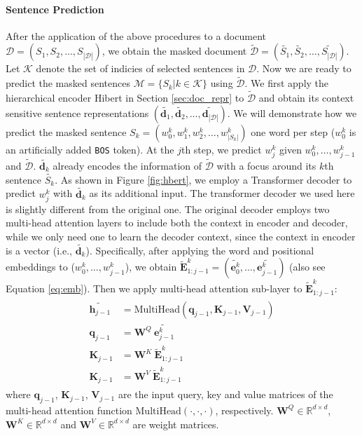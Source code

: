 \documentclass[11pt,a4paper]{article}
\begin{document}
\paragraph{Sentence Prediction} After the application of the above procedures to a document $\mathcal{D} = (S_1, S_2, \dots, S_{| \mathcal{D} |})$, we obtain the masked document $\widetilde{ \mathcal{D} }= (\tilde{S_1}, \tilde{S_2}, \dots, \tilde{S_{| \mathcal{D} |}})$. Let $\mathcal{K} $ denote the set of indicies of selected sentences in $\mathcal{D}$. Now we are ready to predict the masked sentences $\mathcal{M} =  \{S_k | k \in \mathcal{K} \}$ using $\widetilde{ \mathcal{D} }$. 
We first apply the hierarchical encoder {\sc Hibert} in Section \ref{sec:doc_repr} to $\widetilde{ \mathcal{D} }$ and obtain its context sensitive sentence representations $( \tilde{ \mathbf{d}_1 }, \tilde{ \mathbf{d}_2 }, \dots, \tilde{ \mathbf{d}_{| \mathcal{D} |} } )$. We will demonstrate how we predict the masked sentence $S_k = (w_0^k, w_1^k, w_2^k, \dots, w_{|S_k|}^k)$ one word per step ($w_0^k$ is an artificially added {\tt BOS} token). At the $j$th step, we predict $w_j^k$ given $w_0^k,\dots,w_{j-1}^k$ and $\widetilde{ \mathcal{D} }$. $\tilde{ \mathbf{d}_k }$ already encodes the information of $\widetilde{ \mathcal{D} }$ with a focus around its $k$th sentence $\tilde{S_k}$. As shown in Figure \ref{fig:hbert}, we employ a Transformer decoder \cite{vaswani:2017:nips} to predict $w_j^k$ with $\tilde{ \mathbf{d}_k }$ as its additional input. The transformer decoder we used here is slightly different from the original one. The original decoder employs two multi-head attention layers to include both the context in encoder and decoder, while we only need one to learn the decoder context, since the context in encoder is a vector (i.e., $\tilde{ \mathbf{d}_k }$). Specifically, after applying the word and positional embeddings to ($w_0^k,\dots,w_{j-1}^k$), we obtain $\widetilde{ \mathbf{E} }^k_{1:j-1} = (\tilde{\mathbf{e}_0^k}, \dots, \tilde{\mathbf{e}_{j-1}^k})$ (also see Equation \ref{eq:emb}). Then we apply multi-head attention sub-layer to $\widetilde{ \mathbf{E} }^k_{1:j-1}$:
\begin{align}
\label{eq:mhead}
\begin{split}
\tilde{\mathbf{h}_{j-1}} &= \text{MultiHead}(\mathbf{q}_{j-1}, \mathbf{K}_{j-1}, \mathbf{V}_{j-1}) \\
\mathbf{q}_{j-1} &= \mathbf{W}^Q \: \tilde{\mathbf{e}_{j-1}^k}  \\
\mathbf{K}_{j-1} &= \mathbf{W}^K \: \widetilde{ \mathbf{E} }^k_{1:j-1} \\
\mathbf{K}_{j-1} &= \mathbf{W}^V \: \widetilde{ \mathbf{E} }^k_{1:j-1}
\end{split}
\end{align}
where $\mathbf{q}_{j-1}$, $\mathbf{K}_{j-1}$, $\mathbf{V}_{j-1}$ are the input query, key and value matrices of the multi-head attention function \cite{vaswani:2017:nips} $\text{MultiHead}(\cdot, \cdot, \cdot)$, respectively. $\mathbf{W}^Q \in \mathbb{R}^{d \times d}$, $\mathbf{W}^K \in \mathbb{R}^{d \times d}$ and $\mathbf{W}^V \in \mathbb{R}^{d \times d}$ are weight matrices. 
\end{document}
